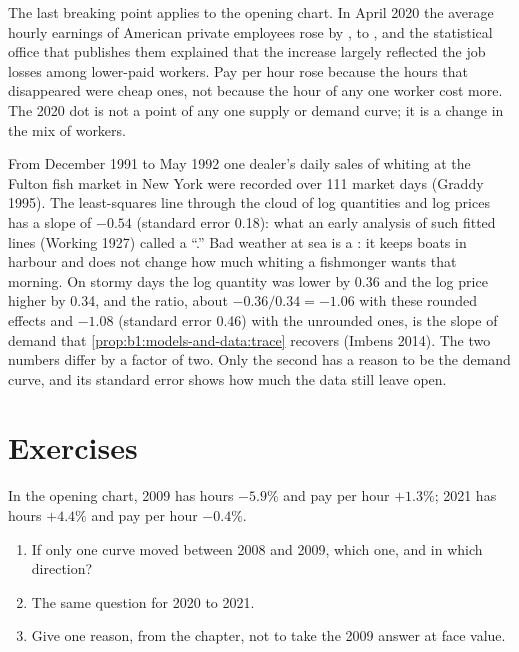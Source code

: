 The last breaking point applies to the opening chart. In April 2020 the
average hourly earnings of American private employees rose by ,
to , %
and the statistical office that publishes them explained that the increase
largely reflected the job losses among lower-paid workers. %
Pay per hour rose because the hours that disappeared were cheap ones, not
because the hour of any one worker cost more. The 2020 dot is not a point
of any one supply or demand curve; it is a change in the mix of workers.

\begin{record}
From December 1991 to May 1992 one dealer's daily sales of whiting at the
Fulton fish market in New York were recorded over 111 market days (Graddy
1995). %
The least-squares line through the cloud of log quantities and log prices
has a slope of $-0.54$ (standard error 0.18): what an early analysis of
such fitted lines (Working 1927) called a ``.''
Bad weather at sea is a : it keeps boats in harbour and does
not change how much whiting a fishmonger wants that morning. On stormy days
the log quantity was lower by 0.36 and the log price higher by 0.34, and
the ratio, about $-0.36/0.34 = -1.06$ with these rounded effects and
$-1.08$ (standard error 0.46) with the unrounded ones, is the slope of
demand that \cref{prop:b1:models-and-data:trace} recovers (Imbens 2014).
The two numbers differ by a factor of two. Only the second has a reason to
be the demand curve, and its standard error shows how much the data still
leave open.
\end{record}

\section*{Exercises}\label{sec:b1:models-and-data:exercises}

\begin{exercise}[$\star$]\label{exo:b1:models-and-data:read-cloud}
In the opening chart, 2009 has hours $-5.9\%$ and pay per hour $+1.3\%$;
2021 has hours $+4.4\%$ and pay per hour $-0.4\%$. %
\begin{enumerate}
  \item If only one curve moved between 2008 and 2009, which one, and in which direction?
  \item The same question for 2020 to 2021.
  \item Give one reason, from the chapter, not to take the 2009 answer at face value.
\end{enumerate}
\end{exercise}

